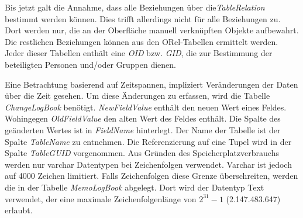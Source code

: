 Bis jetzt galt die Annahme, dass alle Beziehungen über die\textit{TableRelation} bestimmt werden können. Dies trifft allerdings nicht für alle Beziehungen zu. Dort werden nur, die an der Oberfläche manuell verknüpften Objekte aufbewahrt. Die restlichen Beziehungen können aus den ORel-Tabellen ermittelt werden. Jeder dieser Tabellen enthält eine \textit{OID} bzw. \textit{GID}, die zur Bestimmung der beteiligten Personen und/oder Gruppen dienen.

Eine Betrachtung basierend auf Zeitspannen, impliziert Veränderungen der Daten über die Zeit gesehen. Um diese Änderungen zu erfassen, wird die Tabelle \textit{ChangeLogBook} benötigt. \textit{NewFieldValue} enthält den neuen Wert eines Feldes. Wohingegen \textit{OldFieldValue} den alten Wert des Feldes enthält. Die Spalte des geänderten Wertes ist in \textit{FieldName} hinterlegt. Der Name der Tabelle ist der Spalte \textit{TableName} zu entnehmen. Die Referenzierung auf eine Tupel wird in der Spalte \textit{TableGUID} vorgenommen. Aus Gründen des Speicherplatzverbrauchs werden nur varchar Datentypen bei Zeichenfolgen verwendet. Varchar ist jedoch auf 4000 Zeichen limitiert. Falls Zeichenfolgen diese Grenze überschreiten, werden die in der Tabelle \textit{MemoLogBook} abgelegt. Dort wird der Datentyp Text verwendet, der eine maximale Zeichenfolgenlänge von $2^{31}-1$ (2.147.483.647) erlaubt.